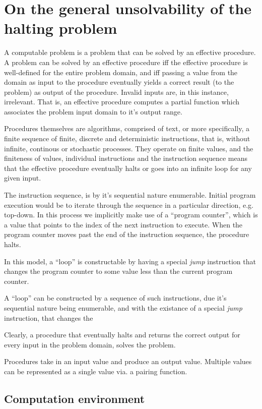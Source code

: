 \chapter{On the general unsolvability of the halting problem}

A computable problem is a problem that can be solved by an effective procedure.
A problem can be solved by an effective procedure iff the effective procedure
is well-defined for the entire problem domain, and iff passing a value from the
domain as input to the procedure eventually yields a correct result (to the
problem) as output of the procedure. Invalid inputs are, in this instance,
irrelevant. That is, an effective procedure computes a partial function which
associates the problem input domain to it's output range.

Procedures themselves are algorithms, comprised of text, or more specifically,
a finite sequence of finite, discrete and deterministic instructions, that is,
without infinite, continous or stochastic processes. They operate on finite
values, and the finiteness of values, individual instructions and the
instruction sequence means that the effective procedure eventually halts or
goes into an infinite loop for any given input. 

The instruction sequence, is by it's sequential nature enumerable. Initial
program execution would be to iterate through the sequence in a particular
direction, e.g. top-down. In this process we implicitly make use of a ``program
counter'', which is a value that points to the index of the next instruction to
execute. When the program counter moves past the end of the instruction
sequence, the procedure halts.

In this model, a ``loop'' is constructable by having a special \emph{jump}
instruction that changes the program counter to some value less than the
current program counter.

A ``loop'' can be constructed by a sequence of such instructions, due it's sequential nature being enumerable, and with the existance of a special \emph{jump} instruction, that changes the 

Clearly, a procedure that eventually halts and returns the correct output for
every input in the problem domain, solves the problem.


Procedures take in an input value and produce an output value. Multiple values
can be represented as a single value via. a pairing function.



\section{Computation environment}


